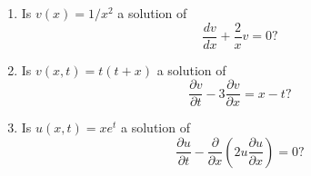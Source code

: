 
\begin{enumerate}
\item Is $v(x) = 1/x^2$ a solution of
\[
\frac{dv}{dx}+\frac{2}{x}v=0?
\]

\item Is $v(x,t) = t(t+x)$ a solution of
\[
\frac{\partial v}{\partial t}-3\frac{\partial v}{\partial x}=x-t?
\]

\item Is $u(x,t) = x e^t$ a solution of
\[
\frac{\partial u}{\partial t}-\frac{\partial}{\partial x}\left(2u\frac{\partial u}{\partial x}\right) = 0?
\]
\end{enumerate}



